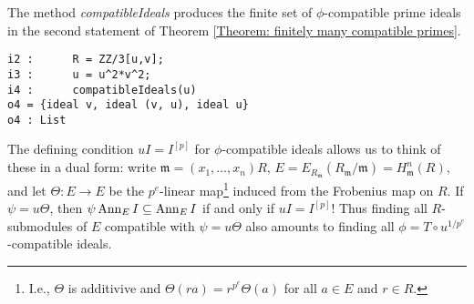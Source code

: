 \documentclass[11pt]{amsart}
\begin{document}
The method \emph{compatibleIdeals} produces the finite set of $\phi$-compatible prime ideals in the second statement of Theorem \ref{Theorem: finitely many compatible primes}.

\begin{verbatim}
i2 :      R = ZZ/3[u,v];
i3 :      u = u^2*v^2;
i4 :      compatibleIdeals(u)
o4 = {ideal v, ideal (v, u), ideal u}
o4 : List
\end{verbatim}

The defining condition $u I = I^{[p]}$ for $\phi$-compatible ideals allows us to
think of these in a dual form: write $\mathfrak{m}=(x_1, \dots, x_n)R$,
$E=E_{R_\mathfrak{m}}(R_{\mathfrak{m}}/\mathfrak{m})=H^n_{\mathfrak{m}} (R)$, and let 
$\Theta: E \rightarrow E$ be the $p^e$-linear map\footnote{I.e., $\Theta$ is additivive and $\Theta (r a)= r^{p^e} \Theta (a)$ for all $a\in E$ and $r\in R$.}
induced from the Frobenius map on $R$.
If $\psi=u \Theta$, then $\psi \operatorname{{Ann}}_E I \subseteq \operatorname{{Ann}}_E I$ if and only if $u I = I^{[p]}$!
Thus finding all $R$-submodules of $E$ compatible with $\psi=u \Theta$ also amounts to finding all
$\phi=T \circ u^{1/p^e}$-compatible ideals.
\end{document}
